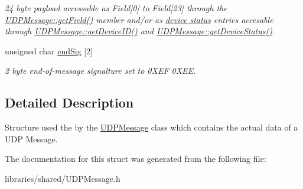 \begin{DoxyCompactItemize}
\begin{DoxyCompactList}\small\item\em 24 byte payload accessable as Field\mbox{[}0\mbox{]} to Field\mbox{[}23\mbox{]} through the \hyperlink{class_u_d_p_message_a869585e0916d3b9edf99111f8fc74709}{U\+D\+P\+Message\+::get\+Field()} member and/or as \hyperlink{struct_message_device_struct}{device status} entries accesable through \hyperlink{class_u_d_p_message_a83b544583226eb4e6b51237c9f350e0f}{U\+D\+P\+Message\+::get\+Device\+I\+D()} and \hyperlink{class_u_d_p_message_acc249c0f6c658bc56c2161946715eb22}{U\+D\+P\+Message\+::get\+Device\+Status()}. \end{DoxyCompactList}\item 
\mbox{\label{struct_u_d_p_message_struct_a68c8ce1a9f79ecb4b3955eaf98a4781c}} 
unsigned char \hyperlink{struct_u_d_p_message_struct_a68c8ce1a9f79ecb4b3955eaf98a4781c}{end\+Sig} \mbox{[}2\mbox{]}
\begin{DoxyCompactList}\small\item\em 2 byte end-\/of-\/message signalture set to 0\+X\+EF 0\+X\+EE. \end{DoxyCompactList}\end{DoxyCompactItemize}


\subsection{Detailed Description}
Structure used the by the \hyperlink{class_u_d_p_message}{U\+D\+P\+Message} class which contains the actual data of a U\+DP Message. 

The documentation for this struct was generated from the following file\+:\begin{DoxyCompactItemize}
\item 
libraries/shared/U\+D\+P\+Message.\+h\end{DoxyCompactItemize}
